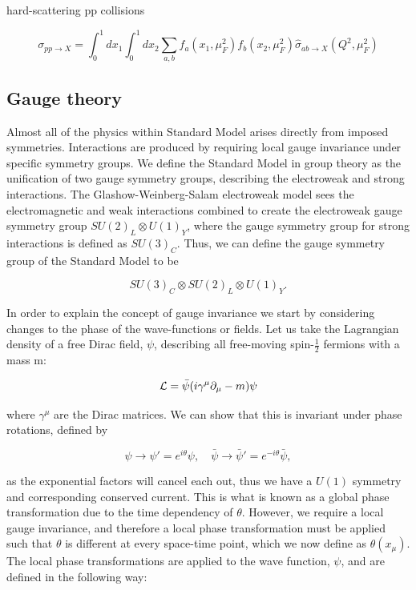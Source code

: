 hard-scattering pp collisions

\begin{equation}
\sigma_{pp \to X} = \int^1_0dx_1 \int^1_0dx_2 \sum_{a,b} f_a(x_1, \mu_F^2) f_b(x_2, \mu_F^2) \hat{\sigma}_{ab \to X}(Q^2, \mu_F^2)
\end{equation}


\subsection{Gauge theory}

Almost all of the physics within Standard Model arises directly from imposed symmetries. Interactions are produced by requiring local gauge invariance under specific symmetry groups. We define the Standard Model in group theory as the unification of two gauge symmetry groups, describing the electroweak and strong interactions. The Glashow-Weinberg-Salam electroweak model sees the electromagnetic and weak interactions combined to create the electroweak gauge symmetry group $SU(2)_L \otimes U(1)_Y$, where the gauge symmetry group for strong interactions is defined as $SU(3)_C$. Thus, we can define the gauge symmetry group of the Standard Model to be 

\begin{equation}
SU(3)_C \otimes SU(2)_L \otimes U(1)_Y.
\end{equation}

In order to explain the concept of gauge invariance we start by considering changes to the phase of the wave-functions or fields. Let us take the Lagrangian density of a free Dirac field, $\psi$, describing all free-moving spin-$\frac{1}{2}$ fermions with a mass m:  

\begin{equation} \label{eqn-DiracLagrangian}
\mathcal{L} = \bar{\psi}(i \gamma^{\mu}\partial_{\mu}-m)\psi
\end{equation}

where $\gamma^{\mu}$ are the Dirac matrices. We can show that this is invariant under phase rotations, defined by

\begin{equation}
\psi \to \psi'= e^{i \theta}\psi, \quad \bar{\psi} \to \bar{\psi}' = e^{- i \theta}\bar{\psi},
\end{equation}

as the exponential factors will cancel each out, thus we have a $U(1)$ symmetry and corresponding conserved current. This is what is known as a global phase transformation due to the time dependency of $\theta$. However, we require a local gauge invariance, and therefore a local phase transformation must be applied such that $\theta$ is different at every space-time point, which we now define as $\theta (x_{\mu})$. The local phase transformations are applied to the wave function, $\psi$, and are defined in the following way:

